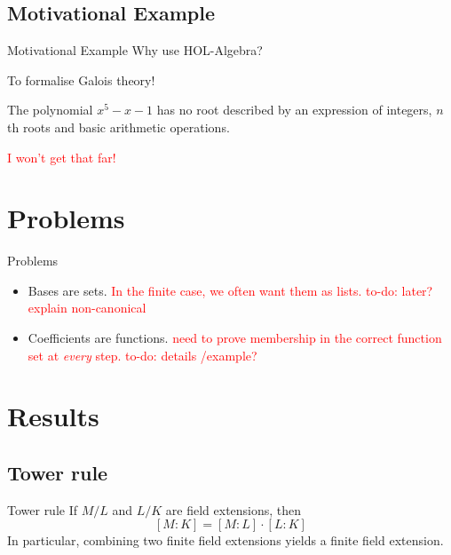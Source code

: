 \documentclass[%
	sans,
	12pt,
]{beamer}
\newcommand{\high}[1]{{\usebeamercolor[fg]{structure} #1}}
\newcommand{\bad}[1]{\textcolor{red}{#1}}
\begin{document}
\subsection{Motivational Example}
\begin{frame}{Motivational Example}
	Why use HOL-Algebra?\pause
	
	\high{To formalise Galois theory!}\pause
	\begin{theorem}
		\upshape
		The polynomial $x^5 − x − 1$ has no root described by an expression of integers, $n$th roots and basic arithmetic operations.
	\end{theorem}\pause
	\bad{I won't get that far!}
\end{frame}

\section{Problems}
\begin{frame}{Problems}
\begin{itemize}
\item Bases are sets.
\bad{In the finite case, we often want them as lists. to-do: later? explain non-canonical}
\item Coefficients are functions.
\bad{need to prove membership in the correct function set at \emph{every} step.
	 to-do: details /example?}
\end{itemize}
\end{frame}

\section{Results}
\subsection{Tower rule}
\begin{frame}{Tower rule}
If $M/L$ and $L/K$ are field extensions, then
\[[M : K] = [M : L] \cdot [L : K]\]\pause %
In particular, combining two finite field extensions yields a finite field extension. %
\end{frame}
\end{document}
